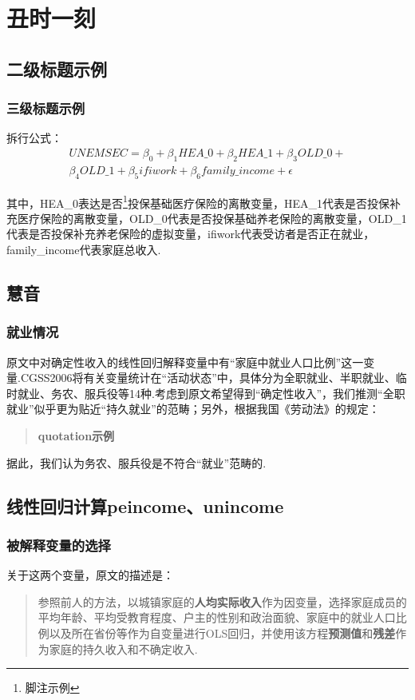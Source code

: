 \documentclass[a4paper,12pt]{report}
\begin{document}
\chapter{丑时一刻}
\section{二级标题示例}
\subsection{三级标题示例}
拆行公式：
\begin{equation*}
\begin{split}
   UNEMSEC = \beta_0 + \beta_1HEA\_0 + \beta_2HEA\_1 + \beta_3OLD\_0 +  \\
     \beta_4OLD\_1 + \beta_5ifiwork + \beta_6family\_income + \epsilon
\end{split}
\end{equation*}

其中，HEA\_0表达是否\footnote{脚注示例}投保基础医疗保险的离散变量，HEA\_1代表是否投保补充医疗保险的离散变量，OLD\_0代表是否投保基础养老保险的离散变量，OLD\_1代表是否投保补充养老保险的虚拟变量，ifiwork代表受访者是否正在就业，family\_income代表家庭总收入.



\section{慧音}
\subsection{就业情况}
原文中对确定性收入的线性回归解释变量中有“家庭中就业人口比例”这一变量.CGSS2006将有关变量统计在“活动状态”中，具体分为全职就业、半职就业、临时就业、务农、服兵役等14种.考虑到原文希望得到“确定性收入”，我们推测“全职就业”似乎更为贴近“持久就业”的范畴；另外，根据我国《劳动法》的规定：
\begin{quotation}
  \textbf{quotation示例}
\end{quotation}

据此，我们认为务农、服兵役是不符合“就业”范畴的.


\section{线性回归计算peincome、unincome}
\subsection{被解释变量的选择}
关于这两个变量，原文的描述是：
\begin{quotation}
  参照前人的方法，以城镇家庭的\textbf{人均实际收入}作为因变量，选择家庭成员的平均年龄、平均受教育程度、户主的性别和政治面貌、家庭中的就业人口比例以及所在省份等作为自变量进行OLS回归，并使用该方程\textbf{预测值}和\textbf{残差}作为家庭的持久收入和不确定收入.
\end{quotation}
\end{document}
